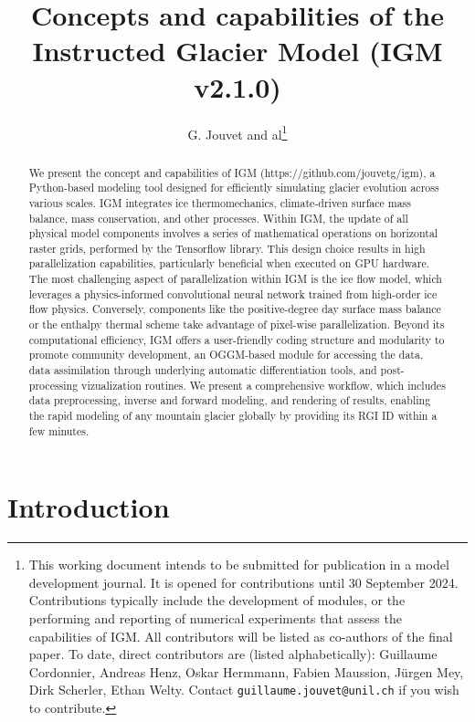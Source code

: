 \documentclass[10pt,twocolumn]{article}
\author{G. Jouvet and al\footnote{This working document intends to be submitted for publication in a model development journal. It is opened for contributions until 30 September 2024. Contributions typically include the development of modules, or the performing and reporting of numerical experiments that assess the capabilities of IGM. All contributors will be listed as co-authors of the final paper. To date, direct contributors are (listed alphabetically): Guillaume Cordonnier, Andreas Henz, Oskar Hermmann, Fabien Maussion, Jürgen Mey, Dirk Scherler, Ethan Welty. Contact \texttt{guillaume.jouvet@unil.ch} if you wish to contribute.}}
\begin{document}
\allowdisplaybreaks 

\title{Concepts and capabilities of the Instructed Glacier Model (IGM v2.1.0)}

\maketitle
 
\begin{abstract}
We present the concept and capabilities of IGM (https://github.com/jouvetg/igm), 
a Python-based modeling tool designed for efficiently simulating glacier evolution 
across various scales. IGM integrates ice thermomechanics, climate-driven surface 
mass balance, mass conservation, and other processes. Within IGM, the update of all physical 
model components involves a series of mathematical operations on horizontal raster grids, 
performed by the Tensorflow library. This design choice results in high parallelization 
capabilities, particularly beneficial when executed on GPU hardware. 
The most challenging aspect of parallelization within IGM is the ice flow model, 
which leverages a physics-informed convolutional neural network 
trained from high-order ice flow physics. Conversely, components like the 
positive-degree day surface mass balance or the enthalpy thermal scheme 
take advantage of pixel-wise parallelization. Beyond its computational efficiency, 
IGM offers a user-friendly coding structure and modularity to promote community 
development, an OGGM-based module for accessing the data, data assimilation through 
underlying automatic differentiation tools, and post-processing vizualization routines. 
We present a comprehensive workflow, which includes data preprocessing, 
inverse and forward modeling, and rendering of results, enabling the rapid modeling 
of any mountain glacier globally by providing its RGI ID within a few minutes. 
\end{abstract}

\section{Introduction} 
\end{document}
